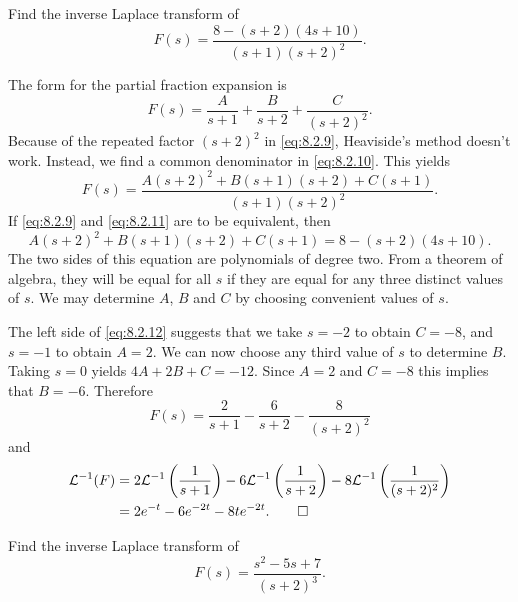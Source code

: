 \begin{example}\label{example:8.2.6}
Find the inverse Laplace transform of
\begin{equation}\label{eq:8.2.9}
F(s)=\frac{8-(s+2)(4s+10)}{(s+1)(s+2)^2}.
\end{equation}
\end{example}

\begin{solution}
The  form for the partial fraction expansion  is
\begin{equation}\label{eq:8.2.10}
F(s)=\frac{A}{s+1}+\frac{B}{s+2}+\frac{C}{(s+2)^2}.
\end{equation}
Because of the repeated factor $(s+2)^2$ in \eqref{eq:8.2.9}, Heaviside's
method doesn't work. Instead, we find a common denominator in
\eqref{eq:8.2.10}. This yields
\begin{equation}\label{eq:8.2.11}
F(s)=\frac{A(s+2)^2+B(s+1)(s+2)+C(s+1)}{(s+1)(s+2)^2}.
\end{equation}
If  \eqref{eq:8.2.9} and  \eqref{eq:8.2.11} are to be equivalent, then
\begin{equation}\label{eq:8.2.12}
A(s+2)^2+B(s+1)(s+2)+C(s+1)=8-(s+2)(4s+10).
\end{equation}
The two sides of this equation are polynomials of degree two. From a
theorem of algebra, they will be equal for all $s$ if they are equal
for any three distinct values of $s$. We may determine $A$, $B$ and
$C$ by choosing convenient values of $s$.

The left side of \eqref{eq:8.2.12} suggests that we take $s=-2$ to obtain
$C=-8$, and $s=-1$ to obtain $A=2$. We can now choose any third value
of $s$ to determine $B$. Taking $s=0$ yields $4A+2B+C=-12$. Since
$A=2$ and $C=-8$ this implies that $B=-6$. Therefore
\[
F(s)=\frac{2}{s+1}-\frac{6}{s+2}-\frac{8}{(s+2)^2}
\]
and
\begin{align*}
{\mathcal L}^{-1}(F)
&=2{\mathcal L}^{-1}\left(\frac{1}{s+1}\right)
-6{\mathcal L}^{-1}\left(\frac{1}{s+2}\right)
-8{\mathcal L}^{-1}\left(\frac{1}{(s+2)^2}\right)\\
&=2e^{-t}-6e^{-2t}-8te^{-2t}.\qedhere
\end{align*}
\end{solution}

\begin{example}\label{example:8.2.7}
Find the inverse Laplace transform of
\[
F(s)=\frac{s^2-5s+7}{(s+2)^3}.
\]
\end{example}

